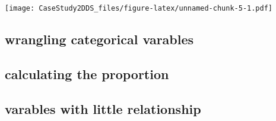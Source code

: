 \documentclass[
]{article}
\newenvironment{Shaded}{\begin{snugshade}}{\end{snugshade}}
\newcommand{\CommentTok}[1]{\textcolor[rgb]{0.56,0.35,0.01}{\textit{#1}}}
\begin{document}
\texttt{[image: CaseStudy2DDS\_files/figure-latex/unnamed-chunk-5-1.pdf]}

\hypertarget{wrangling-categorical-varables}{%
\subsection{wrangling categorical
varables}\label{wrangling-categorical-varables}}

\hypertarget{calculating-the-proportion}{%
\subsection{calculating the
proportion}\label{calculating-the-proportion}}

\hypertarget{varables-with-little-relationship}{%
\subsection{varables with little
relationship}\label{varables-with-little-relationship}}

\begin{Shaded}
\end{Shaded}
\end{document}
